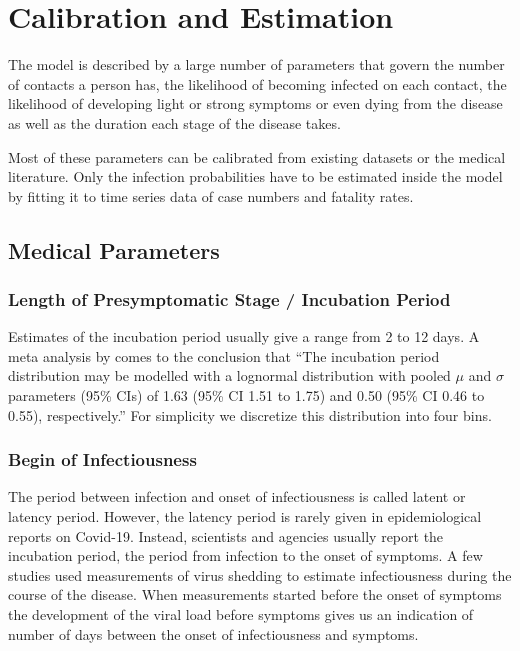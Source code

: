 \section{Calibration and Estimation}
\label{sec:calibration_and_estimation}

The model is described by a large number of parameters that govern the number of contacts a person has, the likelihood of becoming infected on each contact, the likelihood of developing light or strong symptoms or even dying from the disease as well as the duration each stage of the disease takes.

Most of these parameters can be calibrated from existing datasets or the medical literature. Only the infection probabilities have to be estimated inside the model by fitting it to time series data of case numbers and fatality rates.


\subsection{Medical Parameters}

\subsubsection{Length of Presymptomatic Stage / Incubation Period}


Estimates of the incubation period usually give a range from 2 to 12 days. A meta analysis by \cite{McAloon2020} comes to the conclusion that ``The incubation period distribution may be modelled with a lognormal distribution with pooled $\mu$ and $\sigma$ parameters (95\% CIs) of 1.63 (95\% CI 1.51 to 1.75) and 0.50 (95\% CI 0.46 to 0.55), respectively.'' For simplicity we discretize this distribution into four bins.


\subsubsection{Begin of Infectiousness}

The period between infection and onset of infectiousness is called latent or latency period. However, the latency period is rarely given in epidemiological reports on Covid-19. Instead, scientists and agencies usually report the incubation period, the period from infection to the onset of symptoms. A few studies used measurements of virus shedding to estimate infectiousness during the course of the disease. When measurements started before the onset of symptoms the development of the viral load before symptoms gives us an indication of number of days between the onset of infectiousness and symptoms.

